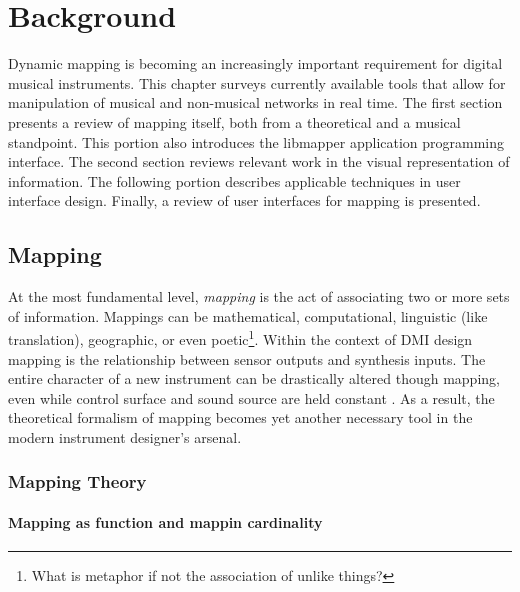 \chapter{Background}

Dynamic mapping is becoming an increasingly important requirement for digital musical instruments. This chapter surveys currently available tools that allow for manipulation of musical and non-musical networks in real time. The first section presents a review of mapping itself, both from a theoretical and a musical standpoint. This portion also introduces the libmapper application programming interface. The second section reviews relevant work in the visual representation of information. The following portion describes applicable techniques in user interface design. Finally, a review of user interfaces for mapping is presented.

			\section{Mapping}

At the most fundamental level, \emph{mapping} is the act of associating two or more sets of information. Mappings can be mathematical, computational, linguistic (like translation), geographic, or even poetic\footnote{What is metaphor if not the association of unlike things?}. Within the context of DMI design mapping is the relationship between sensor outputs and synthesis inputs. The entire character of a new instrument can be drastically altered though mapping, even while control surface and sound source are held constant . As a result, the theoretical formalism of mapping becomes yet another necessary tool in the modern instrument designer's arsenal.

	\subsection{Mapping Theory}

\subsubsection{Mapping as function and mappin cardinality}
\label{sec:mapping_classes}

